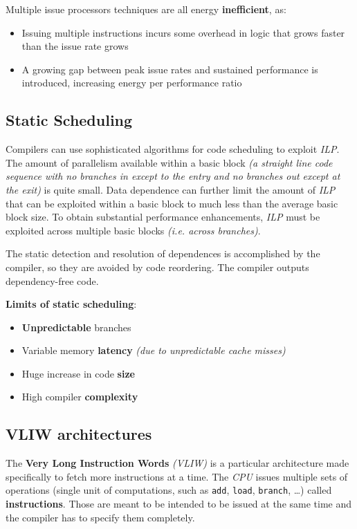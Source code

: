 \documentclass[english]{article}
\begin{document}

Multiple issue processors techniques are all energy \textbf{inefficient}, as:

\begin{itemize}
  \item Issuing multiple instructions incurs some overhead in logic that grows faster than the issue rate grows
  \item A growing gap between peak issue rates and sustained performance is introduced, increasing energy per performance ratio
\end{itemize}

\subsection{Static Scheduling}

Compilers can use sophisticated algorithms for code scheduling to exploit \textit{ILP}.
The amount of parallelism available within a basic block \textit{(a straight line code sequence with no branches in except to the entry and no branches out except at the exit)} is quite small.
Data dependence can further limit the amount of \textit{ILP} that can be exploited within a basic block to much less than the average basic block size.
To obtain substantial performance enhancements, \textit{ILP} must be exploited across multiple basic blocks \textit{(i.e. across branches)}.

The static detection and resolution of dependences is accomplished by the compiler, so they are avoided by code reordering.
The compiler outputs dependency-free code.

\bigskip
\textbf{Limits of static scheduling}:
\begin{itemize}
  \item \textbf{Unpredictable} branches
  \item Variable memory \textbf{latency} \textit{(due to unpredictable cache misses)}
  \item Huge increase in code \textbf{size}
  \item High compiler \textbf{complexity}
\end{itemize}

\subsection{VLIW architectures}

The \textbf{Very Long Instruction Words} \textit{(VLIW)} is a particular architecture made specifically to fetch more instructions at a time.
The \textit{CPU} issues multiple sets of operations (single unit of computations, such as \texttt{add}, \texttt{load}, \texttt{branch}, \ldots) called \textbf{instructions}.
Those are meant to be intended to be issued at the same time and the compiler has to specify them completely.
\end{document}
